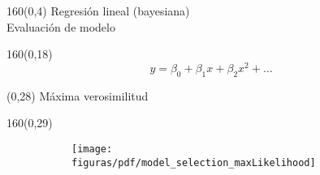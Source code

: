 \documentclass[shownotes,aspectratio=169]{beamer}
\begin{document}
\begin{frame}[plain]
\begin{textblock}{160}(0,4)
\centering  \Large Regresi\'on lineal (bayesiana) \\
\large Evaluación de modelo
\end{textblock}



\begin{textblock}{160}(0,18)
\begin{equation*}
y = \beta_0 + \beta_1 x + \beta_2 x^2 + \dots
\end{equation*}
\end{textblock}

\begin{textblock}{80}(0,28)
 \centering
 M\'axima verosimilitud
\end{textblock}


\begin{textblock}{160}(0,29)
     \centering
  \begin{figure}[H]
     \centering
      \begin{subfigure}[b]{0.45\textwidth}
       \texttt{[image: figuras/pdf/model\_selection\_maxLikelihood]}
     \end{subfigure}
\end{figure}
\end{textblock}

\end{frame}
\end{document}
